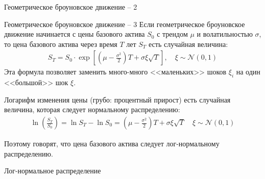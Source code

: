 \documentclass{beamer}
\begin{document}
\begin{frame}{Геометрическое броуновское движение -- 2}
\centering
{}
\end{frame}



\begin{frame}{Геометрическое броуновское движение -- 3}
\justify
Если геометрическое броуновское движение начинается с цены базового актива $S_0$ с трендом $\mu$ и волатильностью $\sigma$, то цена базового актива через время $T$ лет $S_T$ есть случайная величина:
\begin{align*}
S_T = S_0\cdot \exp\left[\left(\mu - \frac{\sigma^2}{2}\right)T + \sigma\xi\sqrt{T}\right], \quad \xi \sim \mathcal{N}(0, 1)
\end{align*}
Эта формула позволяет заменить много-много <<маленьких>> шоков $\xi_i$ на один <<большой>> шок $\xi$.

\justify
Логарифм изменения цены (грубо: процентный прирост) есть случайная величина, которая следует нормальному распределению:
\begin{align*}
\ln\left(\frac{S_T}{S_0}\right) = \ln S_T - \ln S_0 = \left(\mu - \frac{\sigma^2}{2}\right)T + \sigma\xi\sqrt{T} \quad \xi \sim \mathcal{N}(0, 1)
\end{align*}

\justify
Поэтому говорят, что цена базового актива следует лог-нормальному распределению.
\end{frame}



\begin{frame}{Лог-нормальное распределение}
\centering
{}
\end{frame}
\end{document}
